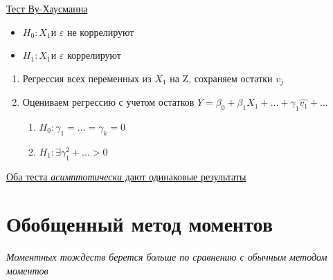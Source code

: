 \documentclass[a4paper, 12pt]{article}
\begin{document}

\begin{center}
    \underline{Тест Ву-Хаусманна}
\end{center}

\begin{itemize}
    \item $H_{0}: X_{1} \textrm{и } \varepsilon$ не коррелируют
    \item $H_{1}: X_{1} \textrm{и } \varepsilon$ коррелируют
\end{itemize}

\begin{enumerate}
    \item Регрессия всех переменных из $X_{1}$ на Z, сохраняем остатки $v_{j}$
    \item Оцениваем регрессию с учетом остатков $Y = \beta_{0} + \beta_{1}X_{1} + ... + \gamma_{1}\hat{v_{1}} + ...$
    \begin{enumerate}
        \item $H_{0}: \gamma_{1} = ... = \gamma_{k} = 0$
        \item $H_{1}: \exists \gamma_{1}^{2} + ... > 0$
    \end{enumerate}
\end{enumerate}

\begin{center}
    \underline{Оба теста \textit{асимптотически} дают одинаковые результаты}
\end{center}

\section{Обобщенный метод моментов}

\textit{Моментных тождеств берется больше по сравнению с обычным методом моментов}
\end{document}
